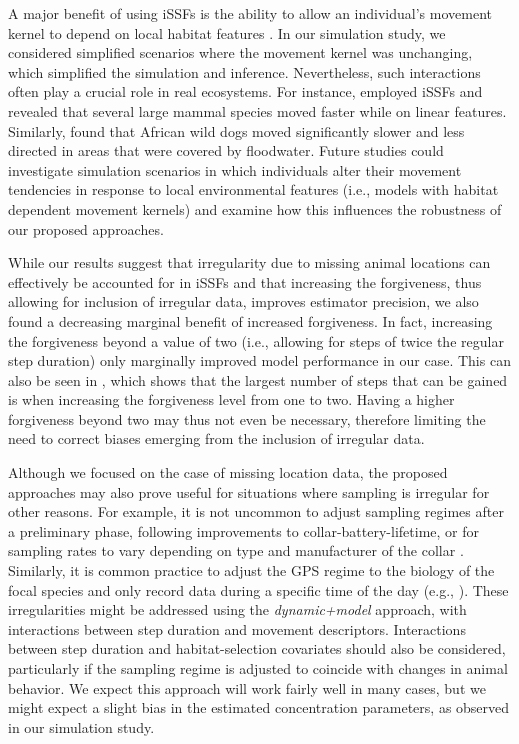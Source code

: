 \documentclass[abstract=on,10pt,a4paper,bibliography=totocnumbered]{article}
\begin{document}
A major benefit of using iSSFs is the ability to allow an individual's movement
kernel to depend on local habitat features \citep{Avgar.2016}. In our simulation
study, we considered simplified scenarios where the movement kernel was
unchanging, which simplified the simulation and inference. Nevertheless, such
interactions often play a crucial role in real ecosystems. For instance,
\citet{Dickie.2020} employed iSSFs and revealed that several large mammal
species moved faster while on linear features. Similarly, \citet{Hofmann.2023}
found that African wild dogs moved significantly slower and less directed in
areas that were covered by floodwater. Future studies could investigate
simulation scenarios in which individuals alter their movement tendencies in
response to local environmental features (i.e., models with habitat dependent
movement kernels) and examine how this influences the robustness of our proposed
approaches.

While our results suggest that irregularity due to missing animal locations can
effectively be accounted for in iSSFs and that increasing the forgiveness, thus
allowing for inclusion of irregular data, improves estimator precision, we also
found a decreasing marginal benefit of increased forgiveness. In fact,
increasing the forgiveness beyond a value of two (i.e., allowing for steps of
twice the regular step duration) only marginally improved model performance in
our case. This can also be seen in , which shows that the
largest number of steps that can be gained is when increasing the forgiveness
level from one to two. Having a higher forgiveness beyond two may thus not even
be necessary, therefore limiting the need to correct biases emerging from the
inclusion of irregular data.

Although we focused on the case of missing location data, the proposed
approaches may also prove useful for situations where sampling is irregular for
other reasons. For example, it is not uncommon to adjust sampling regimes after
a preliminary phase, following improvements to collar-battery-lifetime, or for
sampling rates to vary depending on type and manufacturer of the collar
\citep{Brown.2023}. Similarly, it is common practice to adjust the GPS regime to
the biology of the focal species and only record data during a specific time of
the day (e.g., \citealp{Broekhuis.2013, Cozzi.2013, Elliot.2014}). These
irregularities might be addressed using the \textit{dynamic+model} approach,
with interactions between step duration and movement descriptors. Interactions
between step duration and habitat-selection covariates should also be
considered, particularly if the sampling regime is adjusted to coincide with
changes in animal behavior. We expect this approach will work fairly well in
many cases, but we might expect a slight bias in the estimated concentration
parameters, as observed in our simulation study.
\end{document}
